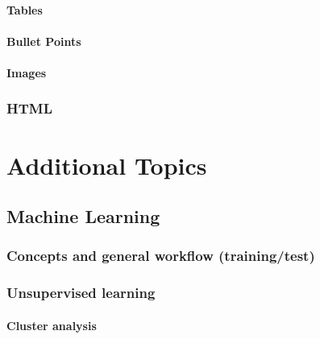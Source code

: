 \documentclass[
]{book}
\begin{document}
\hypertarget{tables}{%
\subsection{Tables}\label{tables}}

\hypertarget{bullet-points}{%
\subsection{Bullet Points}\label{bullet-points}}

\hypertarget{images}{%
\subsection{Images}\label{images}}

\hypertarget{html}{%
\section{HTML}\label{html}}

\hypertarget{part-additional-topics}{%
\part*{Additional Topics}\label{part-additional-topics}}

\hypertarget{machine_learning}{%
\chapter{Machine Learning}\label{machine_learning}}

\hypertarget{concepts-and-general-workflow-trainingtest}{%
\section{Concepts and general workflow (training/test)}\label{concepts-and-general-workflow-trainingtest}}

\hypertarget{unsupervised-learning}{%
\section{Unsupervised learning}\label{unsupervised-learning}}

\hypertarget{cluster-analysis}{%
\subsection{Cluster analysis}\label{cluster-analysis}}
\end{document}
